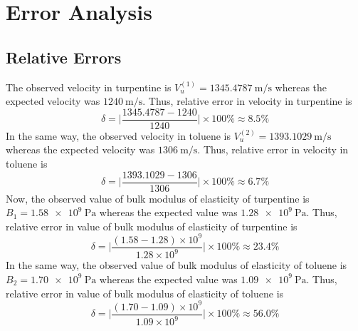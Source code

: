\documentclass{article}
\begin{document}
\section{Error Analysis}
\subsection{Relative Errors}
The observed velocity in turpentine is $V_u^{(1)} = \SI{1345.4787}{\metre \per \second}$ whereas the expected velocity was $\SI{1240}{\metre \per \second}$. Thus, relative error in velocity in turpentine is
\begin{equation}
    \delta = \biggl| \dfrac{1345.4787-1240}{1240} \biggr| \times 100 \% \approx 8.5 \%
\end{equation}
In the same way, the observed velocity in toluene is $V_u^{(2)} = \SI{1393.1029}{\metre \per \second}$ whereas the expected velocity was $\SI{1306}{\metre \per \second}$. Thus, relative error in velocity in toluene is
\begin{equation}
    \delta = \biggl| \dfrac{1393.1029-1306}{1306} \biggr| \times 100 \% \approx 6.7 \%
\end{equation}
Now, the observed value of bulk modulus of elasticity of turpentine is $B_1 = \SI{1.58e9}{\pascal}$ whereas the expected value was $\SI{1.28e9}{\pascal}$. Thus, relative error in value of bulk modulus of elasticity of turpentine is
\begin{equation}
   \delta = \biggl| \dfrac{(1.58 - 1.28) \times 10^9}{1.28 \times 10^9} \biggr| \times 100 \% \approx 23.4 \% 
\end{equation}
In the same way, the observed value of bulk modulus of elasticity of toluene is $B_2 = \SI{1.70e9}{\pascal}$ whereas the expected value was $\SI{1.09e9}{\pascal}$. Thus, relative error in value of bulk modulus of elasticity of toluene is
\begin{equation}
    \delta = \biggl| \dfrac{(1.70 - 1.09) \times 10^9}{1.09 \times 10^9} \biggr| \times 100 \% \approx 56.0 \% 
\end{equation}
\end{document}
